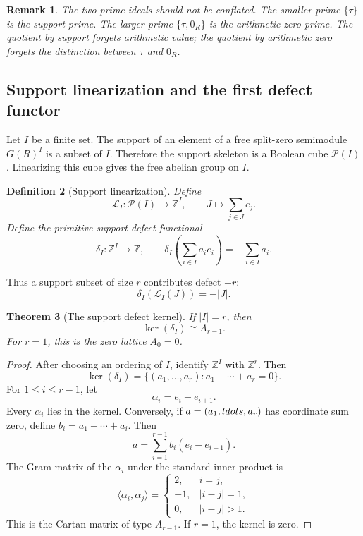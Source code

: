 \documentclass[11pt]{article}
\newtheorem{theorem}{Theorem}[section]
\newtheorem{definition}[theorem]{Definition}
\newtheorem{remark}[theorem]{Remark}
\newcommand{\ZZ}{\mathbb Z}
\begin{document}
\begin{remark}
The two prime ideals should not be conflated.  The smaller prime $\{\tau\}$ is the support prime.  The larger prime $\{\tau,0_R\}$ is the arithmetic zero prime.  The quotient by support forgets arithmetic value; the quotient by arithmetic zero forgets the distinction between $\tau$ and $0_R$.
\end{remark}

\subsection{Support linearization and the first defect functor}

Let $I$ be a finite set.  The support of an element of a free split-zero semimodule $G(R)^I$ is a subset of $I$.  Therefore the support skeleton is a Boolean cube $\mathcal P(I)$.  Linearizing this cube gives the free abelian group on $I$.

\begin{definition}[Support linearization]
Define
\[
        \mathcal L_I:\mathcal P(I)\to\ZZ^I,
        \qquad
        J\mapsto\sum_{j\in J}e_j.
\]
Define the primitive support-defect functional
\[
        \delta_I:\ZZ^I\to\ZZ,
        \qquad
        \delta_I\left(\sum_{i\in I}a_ie_i\right)=-\sum_{i\in I}a_i.
\]
\end{definition}

Thus a support subset of size $r$ contributes defect $-r$:
\[
        \delta_I(\mathcal L_I(J))=-|J|.
\]

\begin{theorem}[The support defect kernel]
If $|I|=r$, then
\[
        \ker(\delta_I)\cong A_{r-1}.
\]
For $r=1$, this is the zero lattice $A_0=0$.
\end{theorem}

\begin{proof}
After choosing an ordering of $I$, identify $\ZZ^I$ with $\ZZ^r$.  Then
\[
        \ker(\delta_I)=\{(a_1,\ldots,a_r):a_1+\cdots+a_r=0\}.
\]
For $1\le i\le r-1$, let
\[
        \alpha_i=e_i-e_{i+1}.
\]
Every $\alpha_i$ lies in the kernel.  Conversely, if $a=(a_1,\\ldots,a_r)$ has coordinate sum zero, define $b_i=a_1+\cdots+a_i$.  Then
\[
        a=\sum_{i=1}^{r-1}b_i(e_i-e_{i+1}).
\]
The Gram matrix of the $\alpha_i$ under the standard inner product is
\[
        \langle\alpha_i,\alpha_j\rangle=\begin{cases}
        2,&i=j,\\
        -1,&|i-j|=1,\\
        0,&|i-j|>1.
        \end{cases}
\]
This is the Cartan matrix of type $A_{r-1}$.  If $r=1$, the kernel is zero.
\end{proof}
\end{document}
